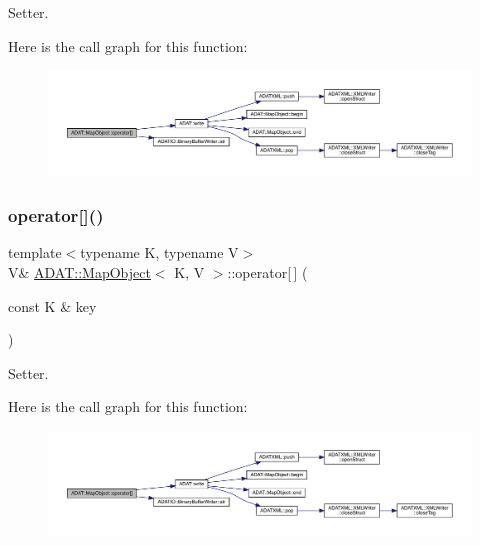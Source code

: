 Setter. 

Here is the call graph for this function\+:
\nopagebreak
\begin{figure}[H]
\begin{center}
\leavevmode
\includegraphics[width=350pt]{da/d29/classADAT_1_1MapObject_ab6ac0d8eccffc7975fd329649dd6f9e7_cgraph}
\end{center}
\end{figure}
\mbox{\label{classADAT_1_1MapObject_ab6ac0d8eccffc7975fd329649dd6f9e7}} 
\subsubsection{\texorpdfstring{operator[]()}{operator[]()}\hspace{0.1cm}{\footnotesize\ttfamily [6/6]}}
{\footnotesize\ttfamily template$<$typename K, typename V$>$ \\
V\& \mbox{\hyperlink{classADAT_1_1MapObject}{A\+D\+A\+T\+::\+Map\+Object}}$<$ K, V $>$\+::operator\mbox{[}$\,$\mbox{]} (\begin{DoxyParamCaption}\item[{const K \&}]{key }\end{DoxyParamCaption})\hspace{0.3cm}{\ttfamily [inline]}}



Setter. 

Here is the call graph for this function\+:
\nopagebreak
\begin{figure}[H]
\begin{center}
\leavevmode
\includegraphics[width=350pt]{da/d29/classADAT_1_1MapObject_ab6ac0d8eccffc7975fd329649dd6f9e7_cgraph}
\end{center}
\end{figure}
\mbox{\label{classADAT_1_1MapObject_ac0f5c3b258d234a7baf4f3d75e304af7}} 
